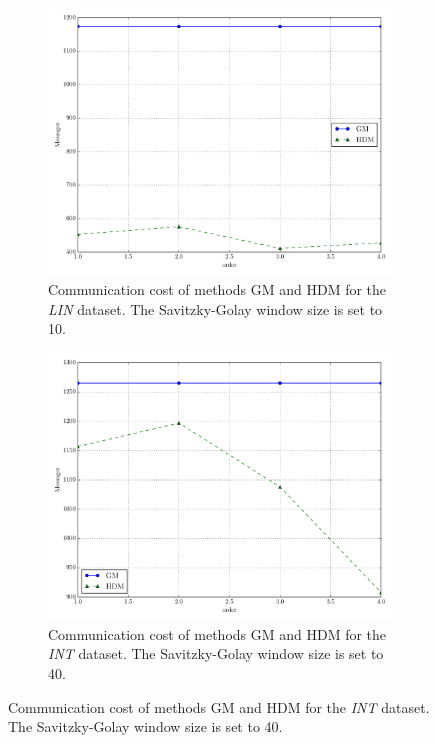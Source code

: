 \begin{figure}[!htb]
\begin{subfigure}{0.32\textwidth}
  \includegraphics[width=\linewidth]{img/main_msg_linear_order.pdf}
  \caption{Communication cost of methods GM and HDM for the \emph{LIN} dataset. The Savitzky-Golay window size is set to 10.}
\end{subfigure}\hfill
\begin{subfigure}{0.32\textwidth}
  \includegraphics[width=\linewidth]{img/main_msg_interweaving_order.pdf}
  \caption{Communication cost of methods GM and HDM for the \emph{INT} dataset. The Savitzky-Golay window size is set to 40.}

\end{subfigure}
\end{figure}
